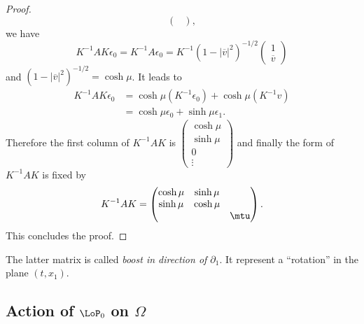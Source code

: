 \begin{proof}
\[\begin{pmatrix}
		\end{pmatrix},
	\]
	we have
	\[
		K^{-1}AK\epsilon_0=K^{-1}A\epsilon_0=K^{-1}(1-|\overline{v}|^2)^{-1/2}
		\begin{pmatrix}
			1 \\\overline{v}
		\end{pmatrix}
	\]
	and $(1-|\overline{v}|^2)^{-1/2}=\cosh\mu$. It leads to
	\[
		\begin{split}
			K^{-1}AK\epsilon_0&=\cosh\mu(K^{-1}\epsilon_0)+\cosh\mu(K^{-1}v)\\
			&=\cosh\mu\epsilon_0+\sinh\mu\epsilon_1.
		\end{split}
	\]
	Therefore the first column of $K^{-1}AK$ is
	$
		\begin{pmatrix}
			\cosh\mu \\\sinh\mu\\0\\\vdots
		\end{pmatrix}
	$ and finally the form of $K^{-1}AK$ is fixed by
	\[
		K^{-1}AK=
		\begin{pmatrix}
			\cosh\mu & \sinh\mu \\\sinh\mu&\cosh\mu\\&&\mtu
		\end{pmatrix}.
	\]
	This concludes the proof.

\end{proof}
The latter matrix is called \emph{boost in direction of $\partial_1$}. It represent a ``rotation'' in the plane $(t,x_1)$.

\subsection{Action of \texorpdfstring{$\LoP_0$}{L0} on \texorpdfstring{$\Omega$}{O}}

